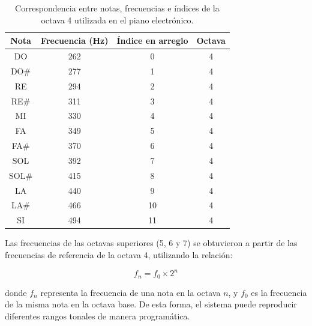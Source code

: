 \begin{table}[H]
\centering
\begin{tabular}{|c|c|c|c|}
\hline
\textbf{Nota} & \textbf{Frecuencia (Hz)} & \textbf{Índice en arreglo} & \textbf{Octava} \\
\hline
DO  & 262 & 0  & 4 \\
DO\# & 277 & 1  & 4 \\
RE  & 294 & 2  & 4 \\
RE\# & 311 & 3  & 4 \\
MI  & 330 & 4  & 4 \\
FA  & 349 & 5  & 4 \\
FA\# & 370 & 6  & 4 \\
SOL & 392 & 7  & 4 \\
SOL\# & 415 & 8  & 4 \\
LA  & 440 & 9  & 4 \\
LA\# & 466 & 10 & 4 \\
SI  & 494 & 11 & 4 \\
\hline
\end{tabular}
\caption{Correspondencia entre notas, frecuencias e índices de la octava 4 utilizada en el piano electrónico.}
\label{tab:notas_piano}
\end{table}

Las frecuencias de las octavas superiores (5, 6 y 7) se obtuvieron a partir de las frecuencias de referencia de la octava 4, 
utilizando la relación:

\[
f_{n} = f_{0} \times 2^{n}
\]

donde \( f_{n} \) representa la frecuencia de una nota en la octava \( n \), 
y \( f_{0} \) es la frecuencia de la misma nota en la octava base. 
De esta forma, el sistema puede reproducir diferentes rangos tonales de manera programática.

